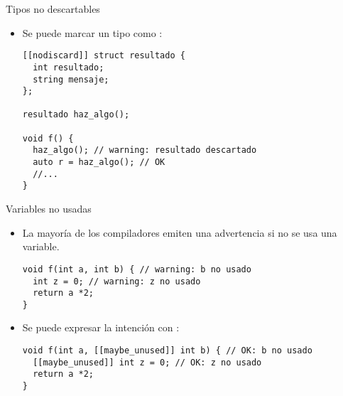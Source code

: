 \begin{frame}[t,fragile]{Tipos no descartables}
\begin{itemize}
  \item Se puede marcar un tipo como :
\begin{lstlisting}
[[nodiscard]] struct resultado {
  int resultado;
  string mensaje;
};

resultado haz_algo();

void f() {
  haz_algo(); // warning: resultado descartado
  auto r = haz_algo(); // OK
  //...
}
\end{lstlisting}
\end{itemize}
\end{frame}

\begin{frame}[t,fragile]{Variables no usadas}
\begin{itemize}
  \item La mayoría de los compiladores emiten una advertencia si no 
        se usa una variable.
\begin{lstlisting}
void f(int a, int b) { // warning: b no usado
  int z = 0; // warning: z no usado 
  return a *2;
}
\end{lstlisting}

  \vfill\pause
  \item Se puede expresar la intención con :
\begin{lstlisting}
void f(int a, [[maybe_unused]] int b) { // OK: b no usado
  [[maybe_unused]] int z = 0; // OK: z no usado 
  return a *2;
}
\end{lstlisting}
\end{itemize}
\end{frame}
